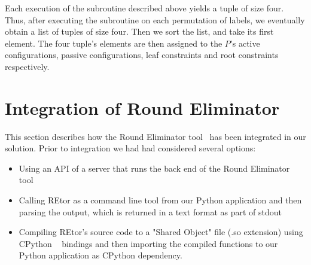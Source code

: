 Each execution of the subroutine described above yields a tuple
of size four. Thus, after executing the subroutine on each permutation of
labels, we eventually obtain a list of tuples of size four.
Then we sort the list, and take its first element. The four
tuple's elements are then assigned to the $P$'s
active configurations, passive configurations, leaf
constraints and root constraints respectively.





  
  





\section{Integration of Round Eliminator}

This section describes how the Round Eliminator
tool~\cite{FIXME} has been integrated in our solution.
Prior to integration we had had considered several options:

\begin{itemize}
  \item Using an API of a server that runs the back end of the Round Eliminator tool
  \item Calling REtor as a command line tool from our Python
  application and then parsing the output, which is returned
  in a text format as part of stdout~\cite{FIXME}
  \item Compiling REtor's source code to a "Shared Object" file (.so extension)
  using CPython ~\cite{FIXME} bindings and then importing the compiled
  functions to our Python application as CPython dependency.
\end{itemize}

